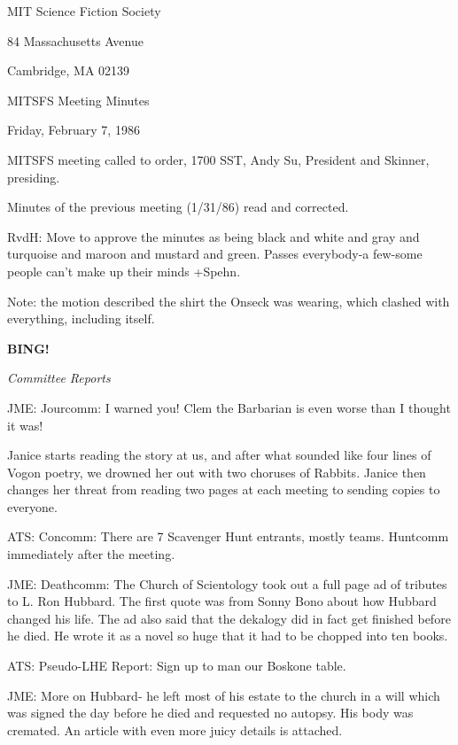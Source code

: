 \documentclass[12pt]{article}
\newcommand{\bing}{{\bf BING!} }
\newcommand{\goto}[1]{\bing \vskip 12pt \centerline{{\em{#1}}}}
\begin{document}
\begin{center}

MIT Science Fiction Society 

84 Massachusetts Avenue

Cambridge, MA 02139

\vspace{12pt}

MITSFS Meeting Minutes 

Friday, February 7, 1986

\end{center}
 
\vspace{18pt}

\setlength{\parskip}{6pt}

\noindent
MITSFS meeting called to order, 1700 SST,
Andy Su, President and Skinner, presiding.

Minutes of the previous meeting (1/31/86) read and corrected.

RvdH: Move to approve the minutes as being black and white and gray and turquoise and maroon and mustard and green. Passes everybody-a few-some people can't make up their minds +Spehn.

Note: the motion described the shirt the Onseck was wearing, which clashed with everything, including itself.

\goto{Committee Reports}

JME: Jourcomm: I warned you! Clem the Barbarian is even worse than I thought it was!

Janice starts reading the story at us, and after what sounded like four lines of Vogon poetry, we drowned her out with two choruses of Rabbits. Janice then changes her threat from reading two pages at each meeting to sending copies to everyone.

ATS: Concomm: There are 7 Scavenger Hunt entrants, mostly teams. Huntcomm immediately after the meeting.

JME: Deathcomm: The Church of Scientology took out a full page ad of tributes to L. Ron Hubbard. The first quote was from Sonny Bono about how Hubbard changed his life. The ad also said that the dekalogy did in fact get finished before he died. He wrote it as a novel so huge that it had to be chopped into ten books.

ATS: Pseudo-LHE Report: Sign up to man our Boskone table.

JME: More on Hubbard- he left most of his estate to the church in a will which was signed the day before he died and requested no autopsy. His body was cremated. An article with even more juicy details is attached.
\end{document}
